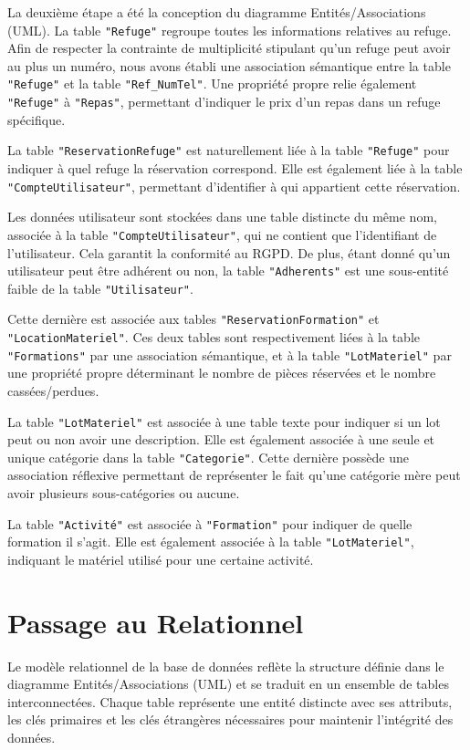 La deuxième étape a été la conception du diagramme Entités/Associations (UML). La table \texttt{"Refuge"} regroupe toutes les informations relatives au refuge. Afin de respecter la contrainte de multiplicité stipulant qu'un refuge peut avoir au plus un numéro, nous avons établi une association sémantique entre la table \texttt{"Refuge"} et la table \texttt{"Ref\_NumTel"}. Une propriété propre relie également \texttt{"Refuge"} à \texttt{"Repas"}, permettant d'indiquer le prix d'un repas dans un refuge spécifique.

La table \texttt{"ReservationRefuge"} est naturellement liée à la table \texttt{"Refuge"} pour indiquer à quel refuge la réservation correspond. Elle est également liée à la table \texttt{"CompteUtilisateur"}, permettant d'identifier à qui appartient cette réservation.

Les données utilisateur sont stockées dans une table distincte du même nom, associée à la table \texttt{"CompteUtilisateur"}, qui ne contient que l'identifiant de l'utilisateur. Cela garantit la conformité au RGPD. De plus, étant donné qu'un utilisateur peut être adhérent ou non, la table \texttt{"Adherents"} est une sous-entité faible de la table \texttt{"Utilisateur"}.

Cette dernière est associée aux tables \texttt{"ReservationFormation"} et \texttt{"LocationMateriel"}. Ces deux tables sont respectivement liées à la table \texttt{"Formations"} par une association sémantique, et à la table \texttt{"LotMateriel"} par une propriété propre déterminant le nombre de pièces réservées et le nombre cassées/perdues.

La table \texttt{"LotMateriel"} est associée à une table texte pour indiquer si un lot peut ou non avoir une description. Elle est également associée à une seule et unique catégorie dans la table \texttt{"Categorie"}. Cette dernière possède une association réflexive permettant de représenter le fait qu'une catégorie mère peut avoir plusieurs sous-catégories ou aucune.

La table \texttt{"Activité"} est associée à \texttt{"Formation"} pour indiquer de quelle formation il s'agit. Elle est également associée à la table \texttt{"LotMateriel"}, indiquant le matériel utilisé pour une certaine activité.


\section{Passage au Relationnel}

Le modèle relationnel de la base de données reflète la structure définie dans le diagramme Entités/Associations (UML) et se traduit en un ensemble de tables interconnectées. Chaque table représente une entité distincte avec ses attributs, les clés primaires et les clés étrangères nécessaires pour maintenir l'intégrité des données.


